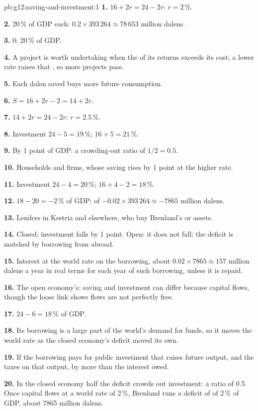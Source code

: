 \begin{solution}{pb:g12:saving-and-investment:1}
\textbf{1.} $16 + 2r = 24 - 2r$: $r = 2\,\%$.

\textbf{2.} 20\,\% of GDP each: $0.2 \times 393\,264 \approx 78\,653$ million dalens.

\textbf{3.}  0;  20\,\% of GDP.

\textbf{4.} A project is worth undertaking when the  of its returns exceeds its cost; a lower rate raises that , so more projects pass.

\textbf{5.} Each dalen saved buys more future consumption.

\textbf{6.} $S = 16 + 2r - 2 = 14 + 2r$.

\textbf{7.} $14 + 2r = 24 - 2r$: $r = 2.5\,\%$.

\textbf{8.} Investment $24 - 5 = 19\,\%$;  $16 + 5 = 21\,\%$.

\textbf{9.} By 1 point of GDP: a crowding-out ratio of $1/2 = 0.5$.

\textbf{10.} Households and firms, whose saving rises by 1 point at the higher rate.

\textbf{11.} Investment $24 - 4 = 20\,\%$;  $16 + 4 - 2 = 18\,\%$.

\textbf{12.} $18 - 20 = -2\,\%$ of GDP:  of $-0.02 \times 393\,264 \approx -7865$ million dalens.

\textbf{13.} Lenders in Kestria and elsewhere, who buy Brenland's  or assets.

\textbf{14.} Closed: investment falls by 1 point. Open: it does not fall; the deficit is matched by borrowing from abroad.

\textbf{15.} Interest at the world rate on the borrowing, about $0.02 \times 7865 \approx 157$ million dalens a year in real terms for each year of such borrowing, unless it is
repaid.

\textbf{16.} The open economy's: saving and investment can differ because capital flows, though the loose link shows flows are not perfectly free.

\textbf{17.} $24 - 6 = 18\,\%$ of GDP.

\textbf{18.} Its borrowing is a large part of the world's demand for funds, so it moves the world rate as the closed economy's deficit moved its own.

\textbf{19.} If the borrowing pays for public investment that raises future output, and the taxes on that output, by more than the interest owed.

\textbf{20.} In the closed economy half the deficit crowds out investment: a ratio of 0.5. Once capital flows at a world rate of 2\,\%, Brenland runs a deficit of 
of 2\,\% of GDP, about 7865 million dalens.
\end{solution}

